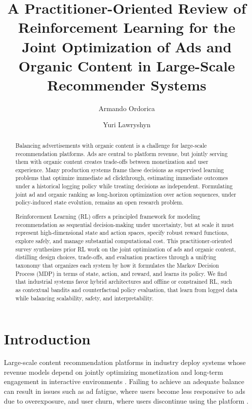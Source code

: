\documentclass[manuscript,review,screen]{acmart}
\title{A Practitioner-Oriented Review of Reinforcement Learning for the Joint Optimization of Ads and Organic Content in Large-Scale Recommender Systems}
\author{Armando Ordorica}
\affiliation{%
    \institution{University of Toronto}
    \city{Toronto}
    \country{Canada}
}
\author{Yuri Lawryshyn}
\affiliation{%
    \institution{University of Toronto}
    \city{Toronto}
    \country{Canada}
}
\begin{document}
\begin{abstract}
Balancing advertisements with organic content is a challenge for large-scale recommendation platforms. Ads are central to platform revenue, but jointly serving them with organic content creates trade-offs between monetization and user experience. Many production systems frame these decisions as supervised learning problems that optimize immediate ad clickthrough, estimating immediate outcomes under a historical logging policy while treating decisions as independent. Formulating joint ad and organic ranking as long-horizon optimization over action sequences, under policy-induced state evolution, remains an open research problem.

Reinforcement Learning (RL) offers a principled framework for modeling recommendation as sequential decision-making under uncertainty, but at scale it must represent high-dimensional state and action spaces, specify robust reward functions, explore safely, and manage substantial computational cost. This practitioner-oriented survey synthesizes prior RL work on the joint optimization of ads and organic content, distilling design choices, trade-offs, and evaluation practices through a unifying taxonomy that organizes each system by how it formulates the Markov Decision Process (MDP) in terms of state, action, and reward, and learns its policy. We find that industrial systems favor hybrid architectures and offline or constrained RL, such as contextual bandits and counterfactual policy evaluation, that learn from logged data while balancing scalability, safety, and interpretability.
\end{abstract}


\maketitle


\section{Introduction}
Large-scale content recommendation platforms in industry deploy systems whose revenue models depend on jointly optimizing monetization and long-term engagement in interactive environments \cite{zhao2020jointly}.
Failing to achieve an adequate balance can result in issues such as ad fatigue, where users become less responsive to ads due to overexposure, and user churn, where users discontinue using the platform \cite{sagtani2023quantifying, silberstein2023combating}.
\end{document}
